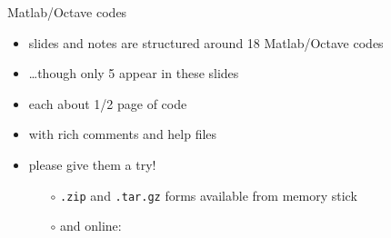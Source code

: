 \begin{comment}
\begin{frame}{outside of scope}

\large\emph{not} \normalsize covered here:\normalsize
\medskip

  \begin{itemize}
  \item Stokes and ``higher order'' flow equations
  \item thermomechanical coupling or polythermal ice
  \item subglacial hydrology/processes
  \item mass balance and snow/firn processes
  \item constitutive relations other than Glen isotropic
  \item grounding lines, calving fronts, ocean interaction
  \item paleo-climate and ``spin-up''
  \item earth deformation under ice sheet load
  \item other numerics: FEM, spectral, multigrid, parallel, \dots
  \item etc.
  \end{itemize}

\end{frame}
\end{comment}


\begin{frame}{Matlab/Octave codes}

\begin{itemize}
\item slides and notes are structured around 18 Matlab/Octave codes
\item \dots though only 5 appear in these slides
\item each about 1/2 page of code
\item with rich comments and help files
\item please give them a try!

  \begin{itemize}
  \item[$\circ$] \texttt{.zip} and \texttt{.tar.gz} forms available from memory stick
  \item[$\circ$] and online:

  \bigskip\bigskip\small
  \centerline{}
  
  \end{itemize}
\end{itemize}
\end{frame}


